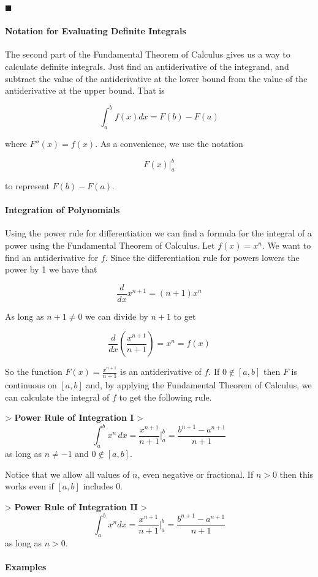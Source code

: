 $\blacksquare$

\paragraph{Notation for Evaluating Definite Integrals}

The second part of the Fundamental Theorem of Calculus gives us a way to calculate definite integrals. Just find an antiderivative of the integrand, and subtract the value of the antiderivative at the lower bound from the value of the antiderivative at the upper bound. That is

$$\int_a^b f(x)dx=F(b)-F(a)$$

where $F''(x)=f(x)$. As a convenience, we use the notation

$$F(x)\bigg|_a^b$$

to represent $F(b)-F(a)$.

\paragraph{Integration of Polynomials}

Using the power rule for differentiation we can find a formula for the integral of a power using the Fundamental Theorem of Calculus. Let $f(x)=x^n$. We want to find an antiderivative for $f$. Since the differentiation rule for powers lowers the power by 1 we have that

$$\frac{d}{dx}x^{n+1}=(n+1)x^n$$

As long as $n+1\ne0$ we can divide by $n+1$ to get

$$\frac{d}{dx}\left(\frac{x^{n+1}}{n+1}\right)=x^n=f(x)$$

So the function $F(x)=\frac{x^{n+1}}{n+1}$ is an antiderivative of $f$. If $0\notin[a,b]$ then $F$ is continuous on $[a,b]$ and, by applying the Fundamental Theorem of Calculus, we can calculate the integral of $f$ to get the following rule.

> \textbf{Power Rule of Integration I}  
> $$\int_a^b x^n\,dx = \frac{x^{n+1}}{n+1}\Bigg|_a^b = \frac{b^{n+1}-a^{n+1}}{n+1}$$ as long as $n\ne-1$ and $0\notin[a,b]$.

Notice that we allow all values of $n$, even negative or fractional. If $n>0$ then this works even if $[a,b]$ includes $0$.

> \textbf{Power Rule of Integration II}  
> $$\int_a^b x^ndx=\frac{x^{n+1}}{n+1}\Bigg|_a^b=\frac{b^{n+1}-a^{n+1}}{n+1}$$ as long as $n>0$.

\paragraph{Examples}

